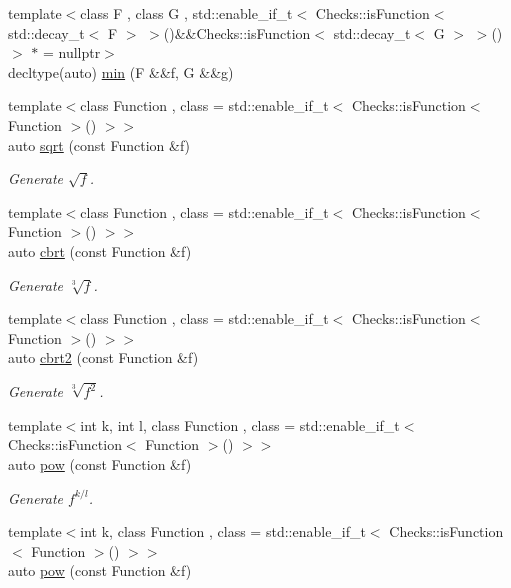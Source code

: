 \begin{DoxyCompactItemize}
\item 
{\footnotesize template$<$class F , class G , std\+::enable\+\_\+if\+\_\+t$<$ Checks\+::is\+Function$<$ std\+::decay\+\_\+t$<$ F $>$ $>$()\&\&\+Checks\+::is\+Function$<$ std\+::decay\+\_\+t$<$ G $>$ $>$() $>$ $\ast$  = nullptr$>$ }\\decltype(auto) \hyperlink{group__CMathGroup_ga3d156db4f00a5d74a7c43c6d8e32f848}{min} (F \&\&f, G \&\&g)
\item 
{\footnotesize template$<$class Function , class  = std\+::enable\+\_\+if\+\_\+t$<$ Checks\+::is\+Function$<$ Function $>$() $>$$>$ }\\auto \hyperlink{group__CMathGroup_ga136c890475e48f88469a737d95368d05}{sqrt} (const Function \&f)
\begin{DoxyCompactList}\small\item\em Generate $ \sqrt{f} $. \end{DoxyCompactList}\item 
{\footnotesize template$<$class Function , class  = std\+::enable\+\_\+if\+\_\+t$<$ Checks\+::is\+Function$<$ Function $>$() $>$$>$ }\\auto \hyperlink{group__CMathGroup_gaa7f2552adfb8ec41aeb685adddd8bf98}{cbrt} (const Function \&f)
\begin{DoxyCompactList}\small\item\em Generate $ \sqrt[3]{f} $. \end{DoxyCompactList}\item 
{\footnotesize template$<$class Function , class  = std\+::enable\+\_\+if\+\_\+t$<$ Checks\+::is\+Function$<$ Function $>$() $>$$>$ }\\auto \hyperlink{group__CMathGroup_gafd27322fb64c6df3366f384c93819a06}{cbrt2} (const Function \&f)
\begin{DoxyCompactList}\small\item\em Generate $ \sqrt[3]{f^2}$. \end{DoxyCompactList}\item 
{\footnotesize template$<$int k, int l, class Function , class  = std\+::enable\+\_\+if\+\_\+t$<$ Checks\+::is\+Function$<$ Function $>$() $>$$>$ }\\auto \hyperlink{group__CMathGroup_gaecae6fa60bbfc0eb1867581ee4577d4e}{pow} (const Function \&f)
\begin{DoxyCompactList}\small\item\em Generate $ f^{k/l} $. \end{DoxyCompactList}\item 
{\footnotesize template$<$int k, class Function , class  = std\+::enable\+\_\+if\+\_\+t$<$ Checks\+::is\+Function$<$ Function $>$() $>$$>$ }\\auto \hyperlink{group__CMathGroup_gab52ffe2efd379aad7ea322de46103465}{pow} (const Function \&f)

\end{DoxyCompactItemize}
